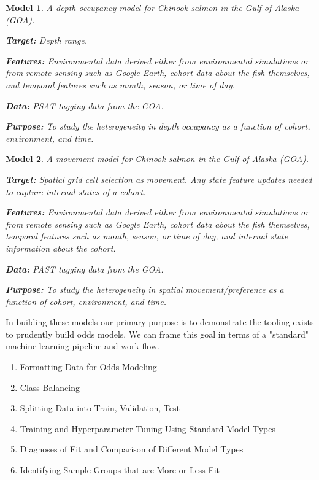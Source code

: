 \documentclass[11pt]{article}
\newtheorem{model}{Model}
\begin{document}
\begin{model}
A depth occupancy model for Chinook salmon in the Gulf of Alaska (GOA). \newline

\textbf{Target:} Depth range. \newline

\textbf{Features:} Environmental data derived either from environmental simulations or from remote sensing such as Google Earth, cohort data about the fish themselves, and temporal features such as month, season, or time of day. \newline

\textbf{Data:} PSAT tagging data from the GOA. \newline 

\textbf{Purpose:} To study the heterogeneity in depth occupancy as a function of cohort, environment, and time.  
\end{model}

\begin{model}
A movement model for Chinook salmon in the Gulf of Alaska (GOA). \newline

\textbf{Target:} Spatial grid cell selection as movement. Any state feature updates needed to capture internal states of a cohort. \newline

\textbf{Features:} Environmental data derived either from environmental simulations or from remote sensing such as Google Earth, cohort data about the fish themselves, temporal features such as month, season, or time of day, and internal state information about the cohort. \newline

\textbf{Data:} PAST tagging data from the GOA. \newline

\textbf{Purpose:} To study the heterogeneity in spatial movement/preference as a function of cohort, environment, and time.\newline

\end{model}

In building these models our primary purpose is to demonstrate the tooling exists to prudently build odds models. We can frame this goal in terms of a "standard" machine learning pipeline and work-flow. 

\begin{enumerate}
\item Formatting Data for Odds Modeling 
\item Class Balancing
\item Splitting Data into Train, Validation, Test
\item Training and Hyperparameter Tuning Using Standard Model Types
\item Diagnoses of Fit and Comparison of Different Model Types
\item Identifying Sample Groups that are More or Less Fit
\end{enumerate}
\end{document}
